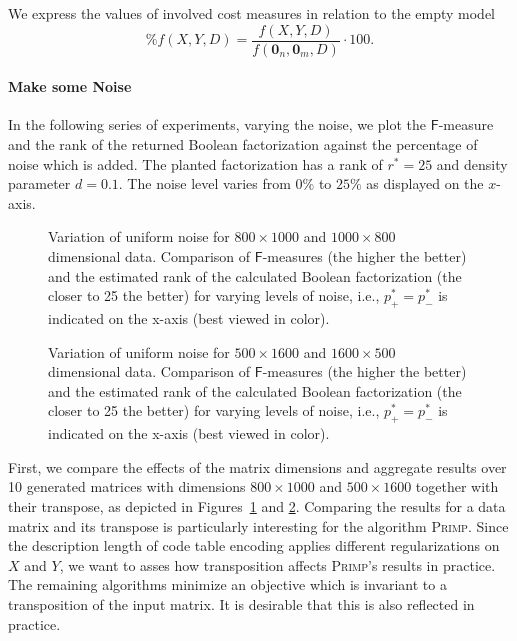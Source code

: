 We express the values of involved cost measures in relation to the empty model
\[
	\%f(X,Y,D) = \frac{f(X,Y,D)}{f(\mathbf{0}_n,\mathbf{0}_m,D)}\cdot 100.
\]
\paragraph{Make some Noise}
In the following series of experiments, varying the noise, we plot the $\mathsf{F}$-measure and the rank of the returned Boolean factorization against the percentage of noise which is added. The planted factorization has a rank of $r^*=25$ and density parameter $d=0.1$. The noise level varies from $0\%$ to $25\%$ as displayed on the $x$-axis.  
\begin{figure}
\centering

\caption{Variation of uniform noise for $800\times 1000$ and $1000\times 800$ dimensional data. Comparison of $\mathsf{F}$-measures (the higher the better) and the estimated rank of the calculated Boolean factorization (the closer to 25 the better) for varying levels of noise, i.e., $p_+^*=p_-^*$ is indicated on the x-axis (best viewed in color).}
\label{fig:noise810}
\end{figure}
\begin{figure}
\centering

\caption{Variation of uniform noise for $500\times 1600$ and $1600\times 500$ dimensional data. Comparison of $\mathsf{F}$-measures (the higher the better) and the estimated rank of the calculated Boolean factorization (the closer to 25 the better) for varying levels of noise, i.e., $p_+^*=p_-^*$ is indicated on the x-axis (best viewed in color).}
\label{fig:noise516}
\end{figure}

First, we compare the effects of the matrix dimensions and aggregate results over 10 generated matrices with dimensions $800\times 1000$ and $500\times 1600$ together with their transpose, as depicted in Figures~\ref{fig:noise810} and \ref{fig:noise516}. Comparing the results for a data matrix and its transpose is particularly interesting for the algorithm \textsc{Primp}. Since the description length of code table encoding applies different regularizations on $X$ and $Y$, we want to asses how transposition affects \textsc{Primp}'s results in practice. The remaining algorithms minimize an objective which is invariant to a transposition of the input matrix. It is desirable that this is also reflected in practice.

